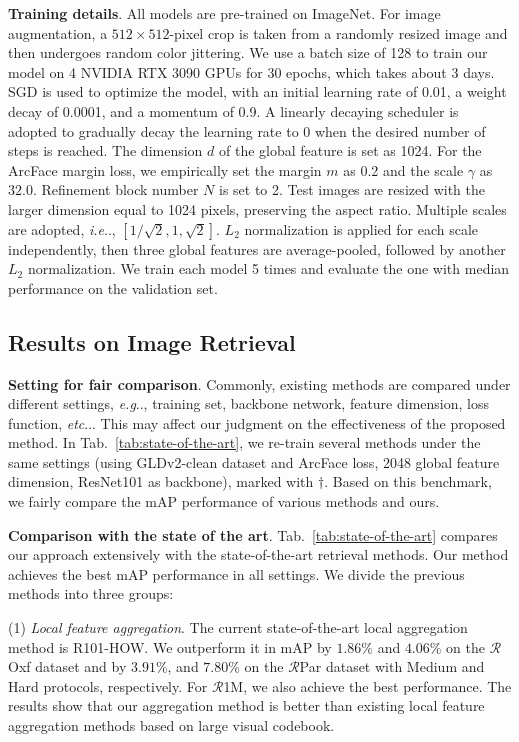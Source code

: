 \documentclass[letterpaper]{article} \usepackage{aaai22}  \usepackage{times}  \usepackage{helvet}  \usepackage{courier}  \usepackage[hyphens]{url}  \usepackage{graphicx} \urlstyle{rm} \def\UrlFont{\rm}  \usepackage{natbib}  \usepackage{caption} \DeclareCaptionStyle{ruled}{labelfont=normalfont,labelsep=colon,strut=off} \frenchspacing  \setlength{\pdfpagewidth}{8.5in}  \setlength{\pdfpageheight}{11in}  \usepackage{algorithm}
\makeatletter
\DeclareRobustCommand\onedot{\futurelet\@let@token\@onedot}
\def\@onedot{\ifx\@let@token.\else.\null\fi\xspace}
\def\eg{\emph{e.g}\onedot} \def\Eg{\emph{E.g}\onedot}
\def\ie{\emph{i.e}\onedot} \def\Ie{\emph{I.e}\onedot}
\def\etc{\emph{etc}\onedot} \def\vs{\emph{vs}\onedot}
\makeatother
\begin{document}
\noindent\textbf{Training details}. 
All models are pre-trained on ImageNet.
For image augmentation, a $512 \times 512$-pixel crop is taken from a randomly resized image and then undergoes random color jittering.
We use a batch size of 128 to train our model on 4 NVIDIA RTX 3090 GPUs for 30 epochs, which takes about 3 days.
SGD is used to optimize the model, with an initial learning rate of 0.01, a weight decay of 0.0001, and a momentum of 0.9. 
A linearly decaying scheduler is adopted to gradually decay the learning rate to 0 when the desired number of steps is reached.
The dimension $d$ of the global feature is set as 1024.
For the ArcFace margin loss, we empirically set the margin $m$ as 0.2 and the
scale $\gamma$ as $32.0$. Refinement block number $N$ is set to 2. Test images are resized with the larger dimension equal to 1024 pixels, preserving the aspect ratio. Multiple scales are adopted, \ie, $\left[1/\sqrt{2},1,\sqrt{2} \right]$. $L_2$ normalization is applied for each scale independently, then three global features are average-pooled, followed by another $L_2$ normalization. We train each model 5 times and evaluate the one with median performance on the validation set.

\subsection{Results on Image Retrieval}
\noindent\textbf{Setting for fair comparison}.
Commonly, existing methods are compared under different settings, 
\eg, training set, backbone network, feature dimension, loss function, \etc. 
This may affect our judgment on the effectiveness of the proposed method. 
In Tab.~\ref{tab:state-of-the-art}, we re-train several methods under the same settings (using GLDv2-clean dataset and ArcFace loss, 2048 global feature dimension, ResNet101 as backbone), marked with $\dagger$. 
Based on this benchmark, we fairly compare the mAP performance of various methods and ours.

\noindent\textbf{Comparison with the state of the art}. Tab.~\ref{tab:state-of-the-art} compares our approach extensively with the state-of-the-art retrieval methods.
Our method achieves the best mAP performance in all settings.
We divide the previous methods into three groups: 

\noindent(1) \textit{Local feature aggregation}. 
The current state-of-the-art local aggregation method is R101-HOW. 
We outperform it in mAP by $1.86\%$ and $4.06\%$ on the $\mathcal{R}$Oxf dataset and by $3.91\%$, and $7.80\%$ on the $\mathcal{R}$Par dataset with Medium and Hard protocols, respectively. 
For $\mathcal{R}$1M, we also achieve the best performance.
The results show that our aggregation method is better than existing local feature aggregation methods based on large visual codebook.
\end{document}
